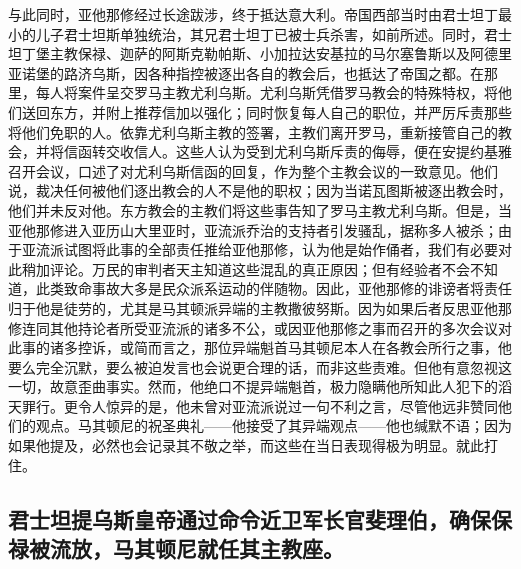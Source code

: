 与此同时，亚他那修经过长途跋涉，终于抵达意大利。帝国西部当时由君士坦丁最小的儿子君士坦斯单独统治，其兄君士坦丁已被士兵杀害，如前所述。同时，君士坦丁堡主教保禄、迦萨的阿斯克勒帕斯、小加拉达安基拉的马尔塞鲁斯以及阿德里亚诺堡的路济乌斯，因各种指控被逐出各自的教会后，也抵达了帝国之都。在那里，每人将案件呈交罗马主教尤利乌斯。尤利乌斯凭借罗马教会的特殊特权，将他们送回东方，并附上推荐信加以强化；同时恢复每人自己的职位，并严厉斥责那些将他们免职的人。依靠尤利乌斯主教的签署，主教们离开罗马，重新接管自己的教会，并将信函转交收信人。这些人认为受到尤利乌斯斥责的侮辱，便在安提约基雅召开会议，口述了对尤利乌斯信函的回复，作为整个主教会议的一致意见。他们说，裁决任何被他们逐出教会的人不是他的职权；因为当诺瓦图斯被逐出教会时，他们并未反对他。东方教会的主教们将这些事告知了罗马主教尤利乌斯。但是，当亚他那修进入亚历山大里亚时，亚流派乔治的支持者引发骚乱，据称多人被杀；由于亚流派试图将此事的全部责任推给亚他那修，认为他是始作俑者，我们有必要对此稍加评论。万民的审判者天主知道这些混乱的真正原因；但有经验者不会不知道，此类致命事故大多是民众派系运动的伴随物。因此，亚他那修的诽谤者将责任归于他是徒劳的，尤其是马其顿派异端的主教撒彼努斯。因为如果后者反思亚他那修连同其他持论者所受亚流派的诸多不公，或因亚他那修之事而召开的多次会议对此事的诸多控诉，或简而言之，那位异端魁首马其顿尼本人在各教会所行之事，他要么完全沉默，要么被迫发言也会说更合理的话，而非这些责难。但他有意忽视这一切，故意歪曲事实。然而，他绝口不提异端魁首，极力隐瞒他所知此人犯下的滔天罪行。更令人惊异的是，他未曾对亚流派说过一句不利之言，尽管他远非赞同他们的观点。马其顿尼的祝圣典礼——他接受了其异端观点——他也缄默不语；因为如果他提及，必然也会记录其不敬之举，而这些在当日表现得极为明显。就此打住。\par


\subsection{君士坦提乌斯皇帝通过命令近卫军长官斐理伯，确保保禄被流放，马其顿尼就任其主教座。}

